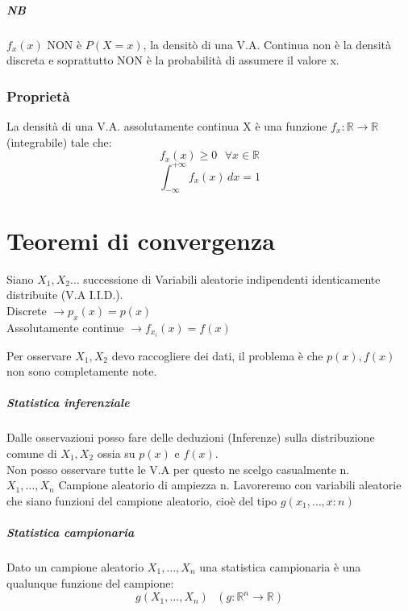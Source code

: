 \documentclass[12pt, a4paper, openany]{book}
\begin{document}
\paragraph{NB} $f_x(x)$ NON è $P(X=x)$, la densitò di una V.A. Continua non è la densità discreta 
e soprattutto NON è la probabilità di assumere il valore x.

\subsection{Proprietà}
La densità di una V.A. assolutamente continua X è una funzione $f_x:\mathbb{R} \rightarrow \mathbb{R}$ (integrabile)
tale che:
\begin{equation*}
    f_x(x) \geq 0 \textrm{ } \forall x \in  \mathbb{R}
\end{equation*}
\begin{equation*}
    \int_{-\infty}^{+\infty} f_x(x)  \,dx = 1
\end{equation*}

\chapter{Teoremi di convergenza}
Siano $X_1, X_2 \dots $ successione di Variabili aleatorie indipendenti identicamente distribuite (V.A I.I.D.).
\\ Discrete $ \rightarrow p_x(x) = p(x) $
\\ Assolutamente continue $ \rightarrow f_{x_i} (x) = f(x) $

Per osservare $X_1, X_2$ devo raccogliere dei dati, il problema è che $p(x), f(x)$ non sono completamente
note. 
\paragraph*{Statistica inferenziale} Dalle osservazioni posso fare delle deduzioni (Inferenze) sulla distribuzione
comune di $X_1, X_2$ ossia su $p(x)$ e $f(x)$.
\\ Non posso osservare tutte le V.A per questo ne scelgo casualmente n. 
\\ $X_1, \dots ,X_n$ Campione aleatorio di ampiezza n. Lavoreremo con variabili aleatorie che siano funzioni del 
campione aleatorio, cioè del tipo $g(x_1, \dots ,x:n)$
\paragraph*{Statistica campionaria} Dato un campione aleatorio $X_1, \dots, X_n$ una statistica campionaria
è una qualunque funzione del campione:
\begin{equation*}
    g(X_1, \dots, X_n) \text{   } (g:\mathbb{R}^n\rightarrow\mathbb{R})
\end{equation*}
\end{document}
